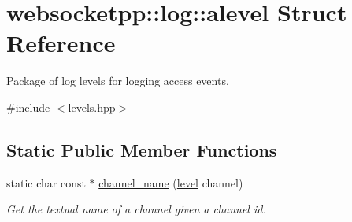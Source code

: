 \hypertarget{structwebsocketpp_1_1log_1_1alevel}{}\section{websocketpp\+:\+:log\+:\+:alevel Struct Reference}
\label{structwebsocketpp_1_1log_1_1alevel}


Package of log levels for logging access events.  




{\ttfamily \#include $<$levels.\+hpp$>$}

\subsection*{Static Public Member Functions}
\begin{DoxyCompactItemize}
\item 
static char const $\ast$ \hyperlink{structwebsocketpp_1_1log_1_1alevel_a7145c18f40f74cff4946994c14634ce9}{channel\+\_\+name} (\hyperlink{namespacewebsocketpp_1_1log_a12d4d17939f102db8c9183d400a41960}{level} channel)
\begin{DoxyCompactList}\small\item\em Get the textual name of a channel given a channel id. \end{DoxyCompactList}\end{DoxyCompactItemize}
